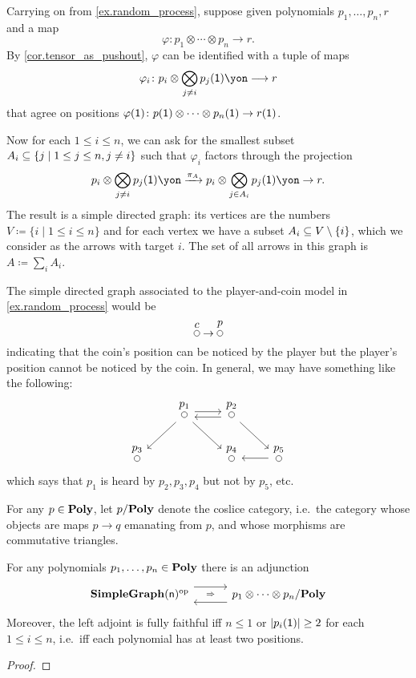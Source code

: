 \documentclass[Book-Poly]{subfiles}
\begin{document}
\begin{example}
Carrying on from \cref{ex.random_process}, suppose given polynomials $p_1,\ldots,p_n,r$ and a map
\[\varphi\colon p_1\otimes\cdots\otimes p_n\to r.\]
By \cref{cor.tensor_as_pushout}, $\varphi$ can be identified with a tuple of maps 
\[\varphi_i\colon p_i\otimes\bigotimes_{j\neq i}p_j(\1)\yon\too r\]
that agree on positions $\varphi(\1)\colon p(\1)\otimes\cdots\otimes p_n(\1)\to r(\1)$.

Now for each $1\leq i\leq n$, we can ask for the smallest subset $A_i\ss\{j\mid 1\leq j\leq n, j\neq i\}$ such that $\varphi_i$ factors through the projection
\[
	p_i\otimes\bigotimes_{j\neq i}p_j(\1)\yon\To{\pi_A}
	p_i\otimes\bigotimes_{j\in A_i}p_j(\1)\yon\to
	r.
\]
The result is a simple directed graph: its vertices are the numbers $V\coloneqq\{i\mid 1\leq i\leq n\}$ and for each vertex we have a subset $A_i\ss V\setminus \{i\}$, which we consider as the arrows with target $i$. The set of all arrows in this graph is $A\coloneqq\sum_{i}A_i$.

The simple directed graph associated to the player-and-coin model in \cref{ex.random_process} would be
\[
\LMO{c}\to\LMO{p}
\]
indicating that the coin's position can be noticed by the player but the player's position cannot be noticed by the coin. In general, we may have something like the following:
\[
\begin{tikzcd}
	&
	\LMO{p_1}\ar[dl]\ar[dr]\ar[r, shift left]&
	\LMO{p_2}\ar[l, shift left]\ar[dr]\\
	\LMO{p_3}&&
	\LMO{p_4}&
	\LMO{p_5}\ar[l]
\end{tikzcd}
\]
which says that $p_1$ is heard by $p_2,p_3,p_4$ but not by $p_5$, etc.
\end{example}

For any $p\in\poly$, let $p/\poly$ denote the coslice category, i.e.\ the category whose objects are maps $p\to q$ emanating from $p$, and whose morphisms are commutative triangles.

\begin{proposition}
For any polynomials $p_1,\ldots,p_n\in\poly$ there is an adjunction
\[
	\adj
		{\Cat{SimpleGraph}(\ord{n})\op}
		{}{}
		{p_1\otimes\cdots\otimes p_n/\poly}
\]
Moreover, the left adjoint is fully faithful iff $n\leq 1$ or $|p_i(\1)|\geq 2$ for each $1\leq i\leq n$, i.e.\ iff each polynomial has at least two positions.
\end{proposition}
\begin{proof}

\end{proof}
\end{document}
